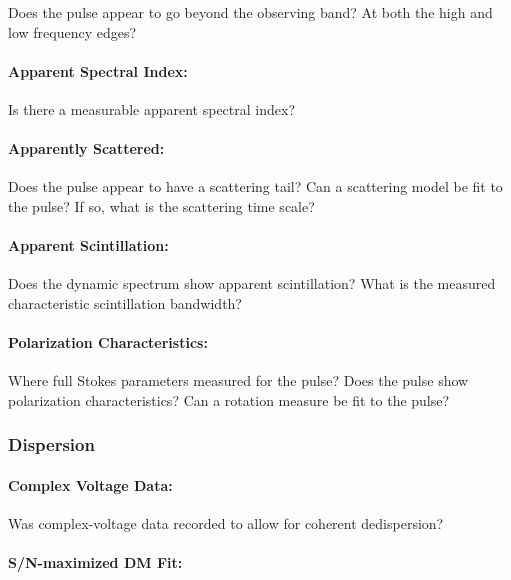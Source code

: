 \documentclass[a4paper,fleqn,usenatbib]{mnras}
\begin{document}
Does the pulse appear to go beyond the observing band? At both the high and low
frequency edges?

\paragraph{Apparent Spectral Index:}

Is there a measurable apparent spectral index?

\paragraph{Apparently Scattered:}

Does the pulse appear to have a scattering tail? Can a scattering model be fit
to the pulse? If so, what is the scattering time scale?

\paragraph{Apparent Scintillation:}

Does the dynamic spectrum show apparent scintillation? What is the
measured characteristic scintillation bandwidth?

\paragraph{Polarization Characteristics:}

Where full Stokes parameters measured for the pulse? Does the pulse show
polarization characteristics? Can a rotation measure be fit to the pulse?


\subsubsection{Dispersion}

\paragraph{Complex Voltage Data:}

Was complex-voltage data recorded to allow for coherent dedispersion?

\paragraph{S/N-maximized DM Fit:}
\end{document}
